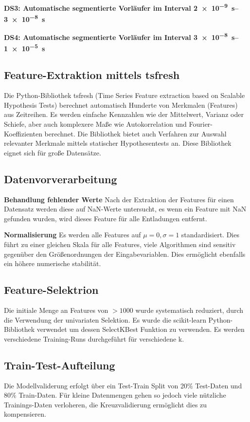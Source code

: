 \textbf{DS3: Automatische segmentierte Vorläufer im Interval \SIrange{2e-9}{3e-8}{\second}}

\textbf{DS4: Automatische segmentierte Vorläufer im Interval \SIrange{3e-8}{1e-5}{\second}}

\subsection{Feature-Extraktion mittels tsfresh}
Die Python-Bibliothek tsfresh (Time Series Feature extraction based on Scalable Hypothesis Tests) berechnet automatisch Hunderte von Merkmalen (Features) aus Zeitreihen. Es werden einfache Kennzahlen wie der Mittelwert, Varianz oder Schiefe, aber auch komplexere Maße wie Autokorrelation und Fourier-Koeffizienten berechnet. Die Bibliothek bietet auch Verfahren zur Auswahl relevanter Merkmale mittels statischer Hypothesentests an. Diese Bibliothek eignet sich für große Datensätze.


\subsection{Datenvorverarbeitung}

\textbf{Behandlung fehlender Werte}\newline
Nach der Extraktion der Features für einen Datensatz werden diese auf NaN-Werte untersucht, es wenn ein Feature mit NaN gefunden wurden, wird dieses Feature für alle Entladungen entfernt.

\textbf{Normalisierung}\newline
Es werden alle Features auf \(\mu = 0, \sigma = 1\) standardisiert. Dies führt zu einer gleichen Skala für alle Features, viele Algorithmen sind sensitiv gegenüber den Größenordnungen der Eingabevariablen. Dies ermöglicht ebenfalls ein höhere numerische stabilität.

\subsection{Feature-Selektrion}

Die initiale Menge an Features von \(> 1000\) wurde systematisch reduziert, durch die Verwendung der univariaten Selektion. Es wurde die scikit-learn Python-Bibliothek verwendet um dessen SelectKBest Funktion zu verwenden. Es werden verschiedene Training-Runs durchgeführt für verschiedene k.%

\subsection{Train-Test-Aufteilung}
Die Modellvaliderung erfolgt über ein Test-Train Split von 20\% Test-Daten und 80\% Train-Daten. Für kleine Datenmengen gehen so jedoch viele nützliche Trainings-Daten verloheren, die Kreuzvalidierung ermöglicht dies zu kompensieren.


